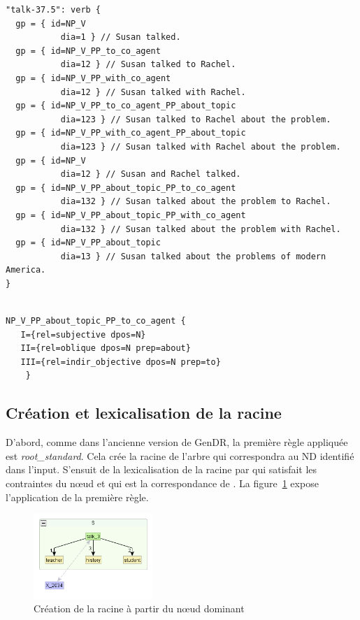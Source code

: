 \begin{lstlisting}[language=mate, caption=Classe \texttt{talk-37.5} dans le \emph{lexicon}]
"talk-37.5": verb {
  gp = { id=NP_V
	       dia=1 } // Susan talked.
  gp = { id=NP_V_PP_to_co_agent
	       dia=12 } // Susan talked to Rachel.
  gp = { id=NP_V_PP_with_co_agent
	       dia=12 } // Susan talked with Rachel.
  gp = { id=NP_V_PP_to_co_agent_PP_about_topic
	       dia=123 } // Susan talked to Rachel about the problem.
  gp = { id=NP_V_PP_with_co_agent_PP_about_topic
	       dia=123 } // Susan talked with Rachel about the problem.
  gp = { id=NP_V
	       dia=12 } // Susan and Rachel talked.
  gp = { id=NP_V_PP_about_topic_PP_to_co_agent
	       dia=132 } // Susan talked about the problem to Rachel.
  gp = { id=NP_V_PP_about_topic_PP_with_co_agent
	       dia=132 } // Susan talked about the problem with Rachel.
  gp = { id=NP_V_PP_about_topic
	       dia=13 } // Susan talked about the problems of modern America.
}
\end{lstlisting}


\begin{lstlisting}[language=XML, caption=Propriétés syntaxiques de \texttt{NP\_V\_PP\_about\_topic\_PP\_to\_co\_agent} , label=gpexemple]

NP_V_PP_about_topic_PP_to_co_agent {
   I={rel=subjective dpos=N}
   II={rel=oblique dpos=N prep=about}
   III={rel=indir_objective dpos=N prep=to}
	}
\end{lstlisting}

\subsection{Création et lexicalisation de la racine}
D'abord, comme dans l'ancienne version de GenDR, la première règle appliquée est \emph{root\_standard}. Cela crée la racine de l'arbre qui correspondra au \ac{ND} identifié dans l'input. S'ensuit de la lexicalisation de la racine par  qui satisfait les contraintes du n\oe{}ud et qui est la correspondance de . La figure~\ref{deroulement0} expose l'application de la première règle.

\begin{figure}[htb]
	\centering
	\includegraphics[width=0.4\textwidth, trim = {0cm 0cm 0cm 0cm},clip]{ch6/figs/root.png}
	\caption{Création de la racine à partir du n\oe{}ud dominant}
	\label{deroulement0}
\end{figure}


